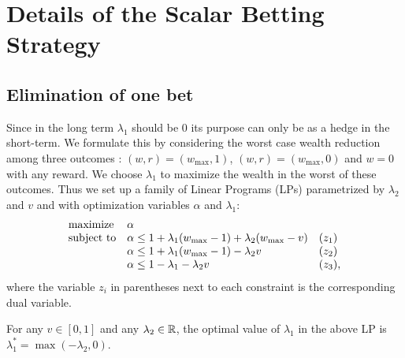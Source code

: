 \section{Details of the Scalar Betting Strategy}
\subsection{Elimination of one bet} \label{app:betaopt}
Since in the long term $\lambda_1$ should be 0 
its purpose can only be as a hedge in the short-term. 
We formulate this by considering the
worst case wealth reduction among three outcomes :
$(w,r)=(w_{\max},1)$, 
$(w,r)=(w_{\max},0)$ and $w=0$ with any reward. 
We choose $\lambda_1$ to maximize the wealth 
in the worst of these outcomes. Thus we set 
up a family of Linear Programs (LPs) 
parametrized by $\lambda_2$ and $v$ and with optimization variables $\alpha$ and $\lambda_1$:
\begin{equation*}
\begin{array}{ll@{}ll}
\text{maximize}  & \alpha &\\
\text{subject to}& \alpha \leq 1+\lambda_1(w_{\max}-1)+\lambda_2(w_{\max}-v)  & &(z_1) \\
                 & \alpha \leq 1+\lambda_1(w_{\max}-1)-\lambda_2 v            & &(z_2) \\
                 & \alpha \leq 1-\lambda_1-\lambda_2 v                        & &(z_3), \\
\end{array}
\end{equation*}
where the variable $z_i$ in parentheses next to each constraint is the corresponding dual variable. 
\begin{theorem}
For any $v\in [0,1]$ and any $\lambda_2 \in \mathbb{R}$, the optimal value of $\lambda_1$ in the above LP is $\lambda_1^*=\max(-\lambda_2,0)$.
\end{theorem}
